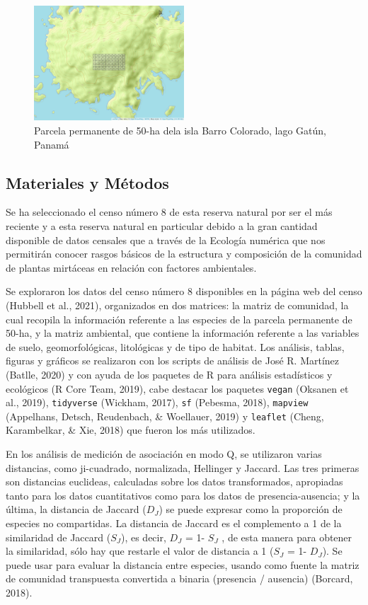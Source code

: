 \documentclass[11pt,]{article}
\begin{document}
\begin{figure}
\centering
\includegraphics[width=0.50000\textwidth]{mapa_cuadros.png}
\caption{Parcela permanente de 50-ha dela isla Barro Colorado, lago
Gatún, Panamá \label{fig:mapa_cuadros_bci}}
\end{figure}

\subsection{Materiales y Métodos}\label{materiales-y-muxe9todos}

Se ha seleccionado el censo número 8 de esta reserva natural por ser el
más reciente y a esta reserva natural en particular debido a la gran
cantidad disponible de datos censales que a través de la Ecología
numérica que nos permitirán conocer rasgos básicos de la estructura y
composición de la comunidad de plantas mirtáceas en relación con
factores ambientales.

Se exploraron los datos del censo número 8 disponibles en la página web
del censo (Hubbell et al., 2021), organizados en dos matrices: la matriz
de comunidad, la cual recopila la información referente a las especies
de la parcela permanente de 50-ha, y la matriz ambiental, que contiene
la información referente a las variables de suelo, geomorfológicas,
litológicas y de tipo de habitat. Los análisis, tablas, figuras y
gráficos se realizaron con los scripts de análisis de José R. Martínez
(Batlle, 2020) y con ayuda de los paquetes de R para análisis
estadísticos y ecológicos (R Core Team, 2019), cabe destacar los
paquetes \texttt{vegan} (Oksanen et al., 2019), \texttt{tidyverse}
(Wickham, 2017), \texttt{sf} (Pebesma, 2018), \texttt{mapview}
(Appelhans, Detsch, Reudenbach, \& Woellauer, 2019) y \texttt{leaflet}
(Cheng, Karambelkar, \& Xie, 2018) que fueron los más utilizados.

En los análisis de medición de asociación en modo Q, se utilizaron
varias distancias, como ji-cuadrado, normalizada, Hellinger y Jaccard.
Las tres primeras son distancias euclideas, calculadas sobre los datos
transformados, apropiadas tanto para los datos cuantitativos como para
los datos de presencia-ausencia; y la última, la distancia de Jaccard
(\(D_J\)) se puede expresar como la proporción de especies no
compartidas. La distancia de Jaccard es el complemento a 1 de la
similaridad de Jaccard (\(S_J\)), es decir, \(D_J\) = 1- \(S_J\) , de
esta manera para obtener la similaridad, sólo hay que restarle el valor
de distancia a 1 (\(S_J\) = 1- \(D_J\)). Se puede usar para evaluar la
distancia entre especies, usando como fuente la matriz de comunidad
transpuesta convertida a binaria (presencia / ausencia) (Borcard, 2018).
\end{document}
